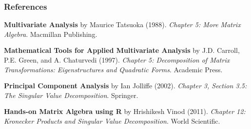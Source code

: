 \documentclass[12pt]{beamer}\usepackage[]{graphicx}\usepackage[]{color}
\begin{document}

\begin{frame}
\frametitle{References}

{\footnotesize
\bi
  \item \textbf{Multivariate Analysis} by Maurice Tatsuoka (1988).
  \textit{Chapter 5: More Matrix Algebra}. Macmillan Publishing.
  \item \textbf{Mathematical Tools for Applied Multivariate Analysis} by J.D. Carroll, P.E. Green, and A. Chaturvedi (1997). 
  \textit{Chapter 5: Decomposition of Matrix Transformations: Eigenstructures and Quadratic Forms}. Academic Press. 
  \item \textbf{Principal Component Analysis} by Ian Jolliffe (2002). 
  \textit{Chapter 3, Section 3.5: The Singular Value Decomposition}. Springer.
  \item \textbf{Hands-on Matrix Algebra using R} by Hrishikesh Vinod (2011).
  \textit{Chapter 12: Kronecker Products and Singular Value Decomposition}. World Scientific.
\ei
}

\end{frame}

\end{document}

